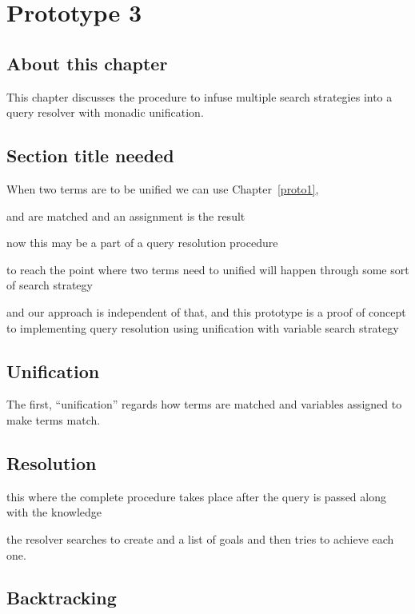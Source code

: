 \documentclass[thesis-solanki.tex]{files}
\begin{document}
\chapter{Prototype 3}{\label{proto3}}


\section{About this chapter}
This chapter discusses the procedure to infuse multiple search strategies into a  query resolver with monadic unification. 



\section{Section title needed}
When two terms are to be unified we can use Chapter~\ref{proto1},

 and  are matched and an assignment is the result 

now this may be a part of a query resolution procedure

to reach the point where two terms need to unified will happen through some sort of search strategy

and our approach is independent of that, and this prototype is a proof of concept to implementing query resolution using unification with
variable search strategy


\section{Unification}
The first, ``unification'' regards how terms are matched and variables assigned to make terms
match.
\cite{website:prologunification}



\section{Resolution}
this where the complete procedure takes place after the query is passed along with the knowledge 

the resolver searches to create and a list of  goals and then tries to achieve each one.

\cite{website:prologresolution}

\cite{website:resolutionlogicwiki}


\section{Backtracking}
\end{document}
